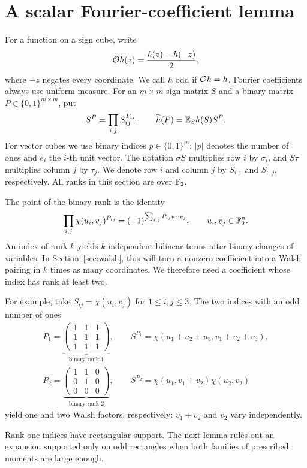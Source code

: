 \section{A scalar Fourier-coefficient lemma}\label{sec:coefficient}

For a function on a sign cube, write
\[
\mathcal O h(z)=\frac{h(z)-h(-z)}2,
\]
where \(-z\) negates every coordinate. We call \(h\) odd if \(\mathcal O h=h\).
Fourier coefficients always use uniform measure. For an \(m\times m\)
sign matrix \(S\) and a binary matrix \(P\in\{0,1\}^{m\times m}\), put
\[
S^P=\prod_{i,j}S_{ij}^{P_{ij}},\qquad
\widehat h(P)=\mathbb E_S h(S)S^P.
\]
For vector cubes we use binary indices \(p\in\{0,1\}^m\);
\(|p|\) denotes the number of ones and \(e_i\) the \(i\)-th unit vector.
The notation \(\sigma S\) multiplies row \(i\) by \(\sigma_i\), and
\(S\tau\) multiplies column \(j\) by \(\tau_j\).
We denote row \(i\) and column \(j\) by \(S_{i,:}\) and \(S_{:,j}\), respectively.
All ranks in this section are over \(\mathbb F_2\).

The point of the binary rank is the identity
\[
\prod_{i,j}\chi(u_i,v_j)^{P_{ij}}
=(-1)^{\sum_{i,j}P_{ij}u_i\cdot v_j},
\qquad u_i,v_j\in\mathbb F_2^n.
\]
An index of rank \(k\) yields \(k\) independent bilinear terms after
binary changes of variables. In Section~\ref{sec:walsh}, this will turn a
nonzero coefficient into a Walsh pairing in \(k\) times as many
coordinates. We therefore need a coefficient whose index has rank
at least two.

\par\medskip\noindent\begin{minipage}{\textwidth}
For example, take \(S_{ij}=\chi(u_i,v_j)\) for \(1\le i,j\le3\).
The two indices with an odd number of ones
\[
\begin{gathered}
P_1=\underbrace{\begin{pmatrix}
1&1&1\\1&1&1\\1&1&1
\end{pmatrix}}_{\text{binary rank }1},
\qquad S^{P_1}=\chi(u_1+u_2+u_3,v_1+v_2+v_3),\\[6pt]
P_2=\underbrace{\begin{pmatrix}
1&1&0\\0&1&0\\0&0&0
\end{pmatrix}}_{\text{binary rank }2},
\qquad S^{P_2}=\chi(u_1,v_1+v_2)\chi(u_2,v_2)
\end{gathered}
\]
yield one and two Walsh factors, respectively: \(v_1+v_2\) and
\(v_2\) vary independently. \end{minipage}\par\medskip
Rank-one indices have rectangular support.
The next lemma rules out an expansion supported only on odd rectangles
when both families of prescribed moments are large enough.

